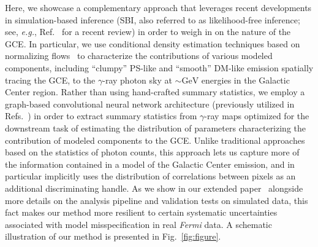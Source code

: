 \documentclass[]{article}
\newcommand{\Fermi}{\emph{Fermi}\xspace}
\begin{document}
Here, we showcase a complementary approach that leverages recent developments in simulation-based inference (SBI, also referred to as likelihood-free inference; see, \emph{e.g.}, Ref.~\cite{Cranmer:2019eaq} for a recent review)
in order to weigh in on the nature of the GCE. In particular, we use conditional density estimation techniques based on normalizing flows~\cite{papamakarios2019normalizing,DBLP:conf/icml/RezendeM15} to characterize the contributions of various modeled components, including ``clumpy'' PS-like and ``smooth'' DM-like emission spatially tracing the GCE, to the $\gamma$-ray photon sky at $\sim\mathrm{GeV}$ energies in the Galactic Center region. Rather than using hand-crafted summary statistics, we employ a graph-based convolutional neural network architecture (previously utilized in Refs.~\cite{List:2020mzd,List:2021aer}) in order to extract summary statistics from $\gamma$-ray maps optimized for the downstream task of estimating the distribution of parameters characterizing the contribution of modeled components to the GCE. Unlike traditional approaches based on the statistics of photon counts, this approach lets us capture more of the information contained in a model of the Galactic Center emission, and in particular implicitly uses the distribution of correlations between pixels as an additional discriminating handle. As we show in our extended paper~\cite{Mishra-Sharma:2021oxe} alongside more details on the analysis pipeline and validation tests on simulated data, this fact makes our method more resilient to certain systematic uncertainties associated with model misspecification in real \Fermi data. A schematic illustration of our method is presented in Fig.~\ref{fig:figure}.
\end{document}
